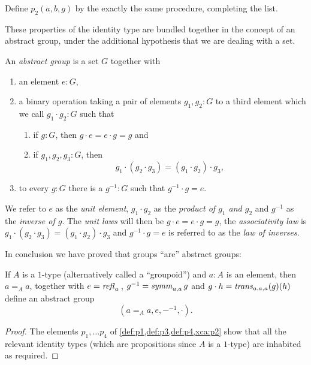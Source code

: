\begin{xca}\label{xca:p2}
    Define $p_2(a,b,g)$ %
by the exactly the same procedure, completing the list.
\end{xca}


These properties of the identity type are bundled together in the concept of an abstract group, under the additional hypothesis that we are dealing with a set.

  \begin{definition}\label{def:abstractgroup}
    An \emph{abstract group} is a set $G$ together with
\begin{enumerate}
\item an element $e:G$,
\item a binary operation taking a pair of elements $g_1,g_2:G$ to a third element which we call $g_1\cdot g_2:G$ such that
  \begin{enumerate}
  \item %
if $g:G$, then $g\cdot e=e\cdot g=g$ and
  \item %
if $g_1,g_2,g_3:G$, then
$$g_1\cdot(g_2\cdot g_3)=(g_1\cdot g_2)\cdot g_3,$$
  \end{enumerate}
\item %
to every $g:G$ there is a $g^{-1}:G$ such that $%
g^{-1}\cdot g=e$.
\end{enumerate}
We refer to $e$ as the \emph{unit element}, $g_1\cdot g_2$ as the \emph{product of $g_1$ and $g_2$} and $g^{-1}$ as the \emph{inverse of $g$}.  The \emph{unit laws} will then be $g\cdot e=e\cdot g=g$, the \emph{associativity law} is $g_1\cdot(g_2\cdot g_3)=(g_1\cdot g_2)\cdot g_3$ and $%
g^{-1}\cdot g=e$ is referred to as the \emph{law of inverses}.
  \end{definition}

In conclusion we have proved that groups ``are'' abstract groups:

  \begin{lemma}\label{lem:idtypesgiveabstractgroups}
    If $A$ is a $1$-type (alternatively called a ``groupoid'') and $a:A$ is an element, then $a=_Aa$, together with $e=\mathop{{\it refl}_{a}}{}$, $g^{-1}=\mathop{\mathit{symm}}_{a,a}g$ and $g\cdot h=\mathop{\mathit{trans}}_{a,a,a}(g)(h)$ define an abstract group
$$(a=_Aa,e,{-}^{-1},\cdot).$$
  \end{lemma}
  \begin{proof}
    The elements $p_1,\dots p_4$ of \cref{def:p1,def:p3,def:p4,xca:p2} show that all the relevant identity types (which are propositions since $A$ is a $1$-type) are inhabited as required.
  \end{proof}

